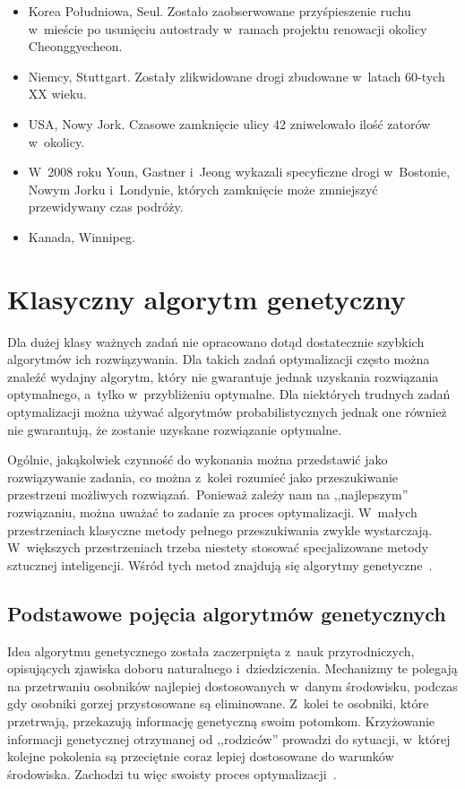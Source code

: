 \documentclass[twoside,12pt]{report}
\begin{document}
\begin{itemize}
\item Korea Południowa, Seul. Zostało zaobserwowane przyśpieszenie ruchu w~mieście po usunięciu autostrady w~ramach projektu renowacji okolicy Cheonggyecheon.

\item Niemcy, Stuttgart. Zostały zlikwidowane drogi zbudowane w~latach 60-tych XX wieku.

\item USA, Nowy Jork. Czasowe zamknięcie ulicy 42 zniwelowało ilość zatorów w~okolicy.

\item W~2008 roku Youn, Gastner i~Jeong wykazali specyficzne drogi w~Bostonie, Nowym Jorku i~Londynie, których zamknięcie może zmniejszyć przewidywany czas podróży.

\item Kanada, Winnipeg.
\end{itemize}

\section{Klasyczny algorytm genetyczny}
Dla dużej klasy ważnych zadań nie opracowano dotąd dostatecznie szybkich algorytmów ich rozwiązywania. Dla takich zadań optymalizacji często można znaleźć wydajny algorytm, który nie gwarantuje jednak uzyskania rozwiązania optymalnego, a~tylko w~przybliżeniu optymalne. Dla niektórych trudnych zadań optymalizacji można używać algorytmów probabilistycznych jednak one również nie gwarantują, że zostanie uzyskane rozwiązanie optymalne.

Ogólnie, jakąkolwiek czynność do wykonania można przedstawić jako rozwiązywanie zadania, co można z~kolei rozumieć jako przeszukiwanie przestrzeni możliwych rozwiązań.~Ponieważ zależy nam na ,,najlepszym'' rozwiązaniu, można uważać to zadanie za proces optymalizacji. W~małych przestrzeniach klasyczne metody pełnego przeszukiwania zwykle wystarczają. W~większych przestrzeniach trzeba niestety stosować specjalizowane metody sztucznej inteligencji. Wśród tych metod znajdują się algorytmy genetyczne~\cite{genetyczne-dane=ewo}.

\subsection{Podstawowe pojęcia algorytmów genetycznych}
Idea algorytmu genetycznego została zaczerpnięta z~nauk przyrodniczych, opisujących zjawiska doboru naturalnego i~dziedziczenia. Mechanizmy te polegają na przetrwaniu osobników najlepiej dostosowanych w~danym środowisku, podczas gdy osobniki gorzej przystosowane są eliminowane. Z~kolei te osobniki, które przetrwają, przekazują informację genetyczną swoim potomkom. Krzyżowanie informacji genetycznej otrzymanej od ,,rodziców'' prowadzi do sytuacji, w~której kolejne pokolenia są przeciętnie coraz lepiej dostosowane do warunków środowiska. Zachodzi tu więc swoisty proces optymalizacji~\cite{genetyczne}. 
\end{document}
